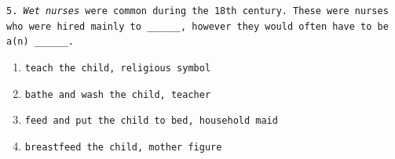\documentclass[11pt]{scrartcl} %
\begin{document}

\texttt{5. \textit{Wet nurses} were common during the 18th century. These were nurses who were hired mainly to \_\_\_\_\_\_, however they would often have to be a(n) \_\_\_\_\_\_.}

\begin{enumerate}[label=\texttt{\textbf{\alph*)}}]
\item \texttt{teach the child, religious symbol}
\item \texttt{bathe and wash the child, teacher}
\item \texttt{feed and put the child to bed, household maid}
\item \texttt{breastfeed the child, mother figure}
\end{enumerate}

\end{document}
